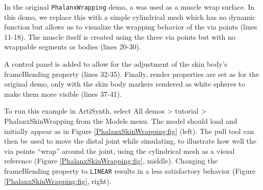 In the original {\tt PhalanxWrapping} demo, a
 was used as a
muscle wrap surface. In this demo, we replace this with a simple
cylindrical mesh which has no dynamic function but allows us to
visualize the wrapping behavior of the via points (lines 11-18).  The
muscle itself is created using the three via points but with no
wrappable segments or bodies (lines 20-30).

A control panel is added to allow for the adjustment of the skin
body's {\sf frameBlending} property (lines 32-35). Finally, render
properties are set as for the original demo, only with the skin body
markers rendered as white spheres to make them more visible (lines
37-41).

To run this example in ArtiSynth, select {\sf All demos > tutorial >
PhalanxSkinWrapping} from the {\sf Models} menu. The model should load
and initially appear as in Figure \ref{PhalanxSkinWrapping:fig}
(left). The pull tool can then be used to move the distal joint
while simulating, to illustrate how well the via points ``wrap''
around the joint, using the cylindrical mesh as a visual reference
(Figure \ref{PhalanxSkinWrapping:fig}, middle).  Changing the {\sf
frameBlending} property to {\tt LINEAR} results in a less satisfactory
behavior (Figure \ref{PhalanxSkinWrapping:fig}, right).

\ifdefined\maindoc
\else

\fi
